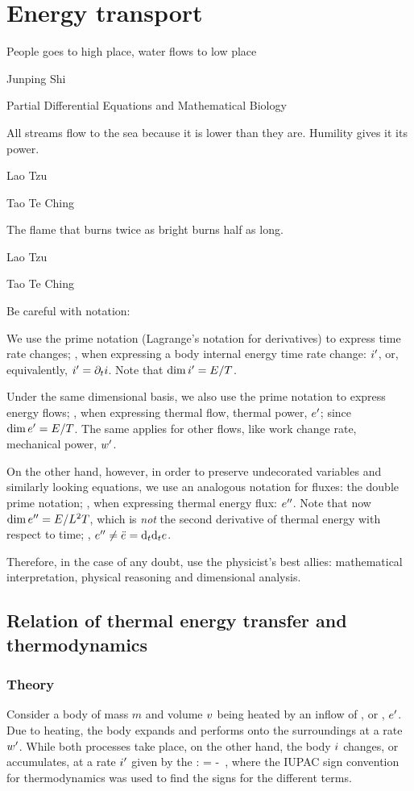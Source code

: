 \section{Energy transport}
\epigraph{People goes to high place, water flows to low place}{Junping Shi}
    {Partial Differential Equations and Mathematical Biology}
\epigraph{All streams flow to the sea because it is lower than they are. Humility gives it its power.}{Lao Tzu}{Tao Te Ching}
\epigraph{The flame that burns twice as bright burns half as long.}{Lao Tzu}{Tao Te Ching}

Be careful with notation:

\begin{caution}
We use the prime notation (Lagrange's notation for derivatives) to express time rate changes; \eg, when expressing a body internal energy time rate change: ${i}^{\prime}$, or, equivalently, ${i}^{\prime} = \partial_{t}i$. Note that $\dim{i}^{\prime} = E/T$.

Under the same dimensional basis, we also use the prime notation to express energy flows; \eg, when expressing thermal flow, \aka thermal power, ${e}^{\prime}$; since $\dim{e}^{\prime} = E/T$. The same applies for other flows, like work change rate, \aka mechanical power, ${w}^{\prime}$.

On the other hand, however, in order to preserve undecorated variables and similarly looking equations, we use an analogous notation for fluxes: the double prime notation; \eg, when expressing thermal energy flux: ${e}^{\prime\prime}$. Note that now $\dim{e}^{\prime\prime} = E/L^2T$, which is \emph{not} the second derivative of thermal energy with respect to time; \ie, ${e}^{\prime\prime} \neq \ddot{e} = \text{d}_{t}{\text{d}_{t}e}$.

Therefore, in the case of any doubt, use the physicist's best allies: mathematical interpretation, physical reasoning and dimensional analysis.
\end{caution}


\subsection{Relation of thermal energy transfer and thermodynamics}

\subsubsection{Theory}
Consider a body of mass $m$ and volume $v$ being heated by an inflow of ,  or , ${e}^{\prime}$. Due to heating, the body expands and performs  onto the surroundings at a rate ${w}^{\prime}$. While both processes take place, on the other hand, the body  $i$ changes, or accumulates, at a rate ${i}^{\prime}$ given by the :
\beq
\rate\ien = \flow\then - \flow\work\,,
\eeq
where the IUPAC sign convention for thermodynamics was used to find the signs for the different terms.

